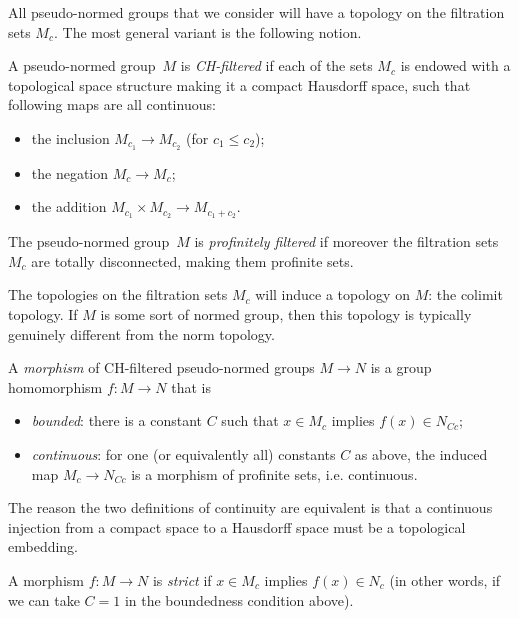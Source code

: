 All pseudo-normed groups that we consider will have a topology on the filtration sets $M_c$.
The most general variant is the following notion.

\begin{definition}
  \label{chpng}
  \leanok
  A pseudo-normed group~$M$ is \emph{CH-filtered}
  if each of the sets $M_c$ is endowed with a topological space structure
  making it a compact Hausdorff space,
  such that following maps are all continuous:
  \begin{itemize}
    \item the inclusion $M_{c_1} \to M_{c_2}$ (for $c_1 \le c_2$);
    \item the negation $M_c \to M_c$;
    \item the addition $M_{c_1} \times M_{c_2} \to M_{c_1 + c_2}$.
  \end{itemize}

  The pseudo-normed group~$M$ is \emph{profinitely filtered} if moreover
  the filtration sets~$M_c$ are totally disconnected, making them profinite sets.
\end{definition}

\begin{remark}
  The topologies on the filtration sets $M_c$ will induce a topology on $M$: the colimit topology.
  If $M$ is some sort of normed group, then this topology is typically genuinely different from the norm topology.
\end{remark}

\begin{definition}
  \label{chpng-hom}
  \leanok
  A \emph{morphism} of CH-filtered pseudo-normed groups $M \to N$
  is a group homomorphism $f \colon M \to N$ that is
  \begin{itemize}
    \item \emph{bounded}:
      there is a constant $C$
      such that $x \in M_c$ implies $f(x) \in N_{Cc}$;
    \item \emph{continuous}:
      for one (or equivalently all) constants $C$ as above,
      the induced map $M_c \to N_{Cc}$ is
      a morphism of profinite sets, i.e. continuous.
  \end{itemize}
  The reason the two definitions of continuity are equivalent is that a continuous injection from a compact space to a Hausdorff space must be a topological embedding.

  A morphism $f \colon M \to N$ is \emph{strict} if $x \in M_c$ implies $f(x) \in N_c$
  (in other words, if we can take $C = 1$ in the boundedness condition above).
\end{definition}

